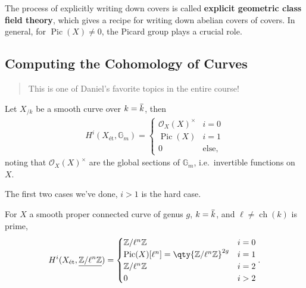 \begin{remark}

The process of explicitly writing down covers is called \textbf{explicit
geometric class field theory}, which gives a recipe for writing down
abelian covers of covers. In general, for
\({\operatorname{Pic}}(X) \neq 0\), the Picard group plays a crucial
role.

\end{remark}

\hypertarget{computing-the-cohomology-of-curves}{%
\subsection{Computing the Cohomology of
Curves}\label{computing-the-cohomology-of-curves}}

\begin{quote}
This is one of Daniel's favorite topics in the entire course!
\end{quote}

\begin{theorem}[?]

Let \(X_{/k}\) be a smooth curve over
\(k=\mkern 1.5mu\overline{\mkern-1.5muk\mkern-1.5mu}\mkern 1.5mu\), then
\begin{align*}  
H^i(X_\text{ét}, {\mathbb{G}}_m) 
=
\begin{cases}
{\mathcal{O}}_X(X)^{\times}& i = 0\\
{\operatorname{Pic}}(X) & i=1 \\
0 & \text{else},
\end{cases}
\end{align*}
noting that \({\mathcal{O}}_X(X)^{\times}\) are the global sections of
\({\mathbb{G}}_m\), i.e.~invertible functions on \(X\).

\end{theorem}

The first two cases we've done, \(i>1\) is the hard case.

\begin{corollary}[?]

For \(X\) a smooth proper connected curve of genus \(g\),
\(k=\mkern 1.5mu\overline{\mkern-1.5muk\mkern-1.5mu}\mkern 1.5mu\), and
\(\ell \neq \operatorname{ch}(k)\) is prime,
\begin{align*}  
H^i(X_\text{ét}, \underline{\mathbb{Z}/\ell^n\mathbb{Z}})
=
\begin{cases}
\mathbb{Z}/\ell^n\mathbb{Z}& i = 0 \\
{\operatorname{Pic}}(X)[\ell^n] = \qty{\mathbb{Z}/\ell^n\mathbb{Z}}^{2g} & i=1 \\
\mathbb{Z}/\ell^n\mathbb{Z}& i=2 \\
0 & i>2
\end{cases}
.\end{align*}

\end{corollary}

